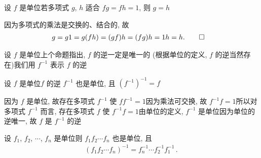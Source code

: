 \begin{proposition}
    设 $f$ 是单位\period 若多项式 $g$, $h$ 适合 $fg = fh = 1$, 则 $g = h$\period
\end{proposition}

\begin{pf}
    因为多项式的乘法是交换的、结合的, 故
    \begin{align*}
         & g = g1 = g(fh) = (gf)h = (fg)h = 1h = h . \qedhere
    \end{align*}
\end{pf}

\begin{definition}
    设 $f$ 是单位\period 上个命题指出, $f$ 的逆一定是唯一的 (根据单位的定义, $f$ 的逆当然存在)\period 我们用 $f^{-1}$ 表示 $f$ 的逆\period
\end{definition}

\begin{proposition}
    设 $f$ 是单位\period $f$ 的逆 $f^{-1}$ 也是单位, 且 $(f^{-1})^{-1} = f$\period
\end{proposition}

\begin{pf}
    因为 $f$ 是单位, 故存在多项式 $f^{-1}$ 使 $ff^{-1} = 1$\period 因为乘法可交换, 故 $f^{-1} f = 1$\period 所以对多项式 $f^{-1}$ 而言, 存在多项式 $f$ 使 $f^{-1} f = 1$\period 由单位的定义, $f^{-1}$ 是单位\period 因为单位的逆唯一, 故 $f$ 是 $f^{-1}$ 的逆\period
\end{pf}

\begin{proposition}
    设 $f_1$, $f_2$, $\cdots$, $f_n$ 是单位\period 则 $f_1 f_2 \cdots f_n$ 也是单位, 且
    \begin{align*}
        (f_1 f_2 \cdots f_n)^{-1} = f_n^{-1} \cdots f_2^{-1} f_1^{-1} \period
    \end{align*}
\end{proposition}


